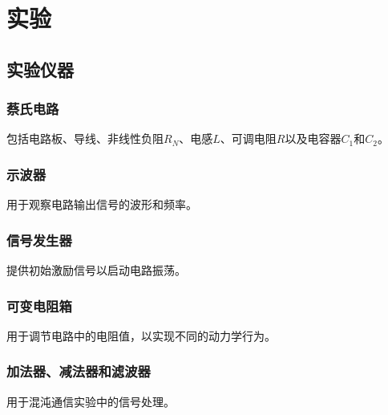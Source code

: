 \documentclass[a4paper, 1.5lines]{ctexart}
\begin{document}
    \section{实验}
     
        \subsection{实验仪器}
            \subsubsection{蔡氏电路}
                包括电路板、导线、非线性负阻$R_N$、电感$L$、可调电阻$R$以及电容器$C_1$和$C_2$。
            \subsubsection{示波器}
                用于观察电路输出信号的波形和频率。
            \subsubsection{信号发生器}
                提供初始激励信号以启动电路振荡。
            \subsubsection{可变电阻箱}
                用于调节电路中的电阻值，以实现不同的动力学行为。
            \subsubsection{加法器、减法器和滤波器}
                用于混沌通信实验中的信号处理。
\end{document}
